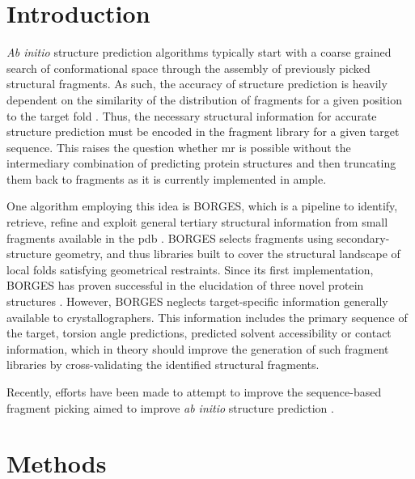 \section{Introduction}

\textit{Ab initio} structure prediction algorithms typically start with a coarse grained search of conformational space through the assembly of previously picked structural fragments. As such, the accuracy of structure prediction is heavily dependent on the similarity of the distribution of fragments for a given position to the target fold \cite{Gront2011-ik}. Thus, the necessary structural information for accurate structure prediction must be encoded in the fragment library for a given target sequence. This raises the question whether \gls{mr} is possible without the intermediary combination of predicting protein structures and then truncating them back to fragments as it is currently implemented in \gls{ample}.

One algorithm employing this idea is BORGES, which is a pipeline to identify, retrieve, refine and exploit general tertiary structural information from small fragments available in the \gls{pdb} \cite{Sammito2013-tt}. BORGES selects fragments using secondary-structure geometry, and thus libraries built to cover the structural landscape of local folds satisfying geometrical restraints. Since its first implementation, BORGES has proven successful in the elucidation of three novel protein structures \cite{Millan2015-ih,Sammito2013-tt}. However, BORGES neglects target-specific information generally available to crystallographers. This information includes the primary sequence of the target, torsion angle predictions, predicted solvent accessibility or contact information, which in theory should improve the generation of such fragment libraries by cross-validating the identified structural fragments.

Recently, efforts have been made to attempt to improve the sequence-based fragment picking aimed to improve \textit{ab initio} structure prediction \cite{Kalev2011-te,Bhattacharya2016-bp,Wang2017-ox,De_Oliveira2015-ba,Gront2011-ik}.



\section{Methods}
